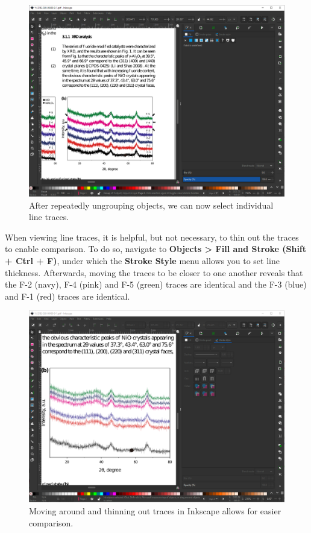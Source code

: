\documentclass[letterpaper, 12pt]{article}
\begin{document}
\begin{figure}[h!tbp]
    \includegraphics[width=\textwidth]{img/vector/in_inkscape_individual_traces.PNG}
    \caption*{After repeatedly ungrouping objects, we can now select individual line traces.}
\end{figure}

\pagebreak
When viewing line traces, it is helpful, but not necessary, to thin out the traces to enable comparison. To do so, navigate to \textbf{Objects > Fill and Stroke (Shift + Ctrl + F)}, under which the \textbf{Stroke Style} menu allows you to set line thickness. Afterwards, moving the traces to be closer to one another reveals that the F-2 (navy), F-4 (pink) and F-5 (green) traces are identical and the F-3 (blue) and F-1 (red) traces are identical.

\begin{figure}[h!tbp]
    \includegraphics[width=\textwidth]{img/vector/in_inkscape_individual_traces_thinned.PNG}
    \caption*{Moving around and thinning out traces in Inkscape allows for easier comparison.}
\end{figure}
\end{document}
